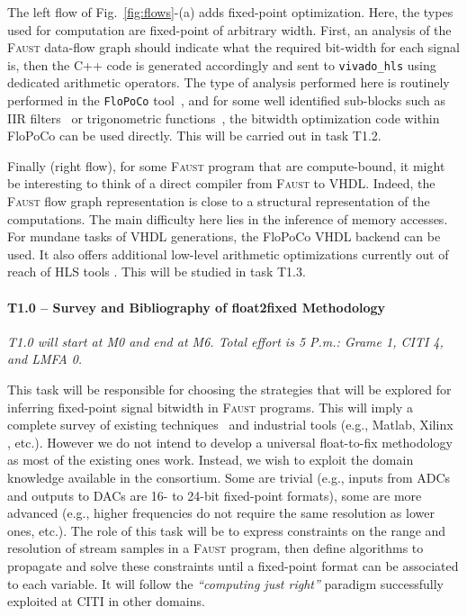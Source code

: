 \documentclass[a4paper,9pt]{extarticle}
\newcommand{\F}{\textsc{Faust}}
\begin{document}
The left flow of Fig.~\ref{fig:flows}-(a) adds fixed-point optimization.  Here, the types used for computation are fixed-point of arbitrary width. First, an analysis of the \F{} data-flow graph should indicate what the required bit-width for each signal is, then the C++ code is generated accordingly and sent to {\tt vivado\_hls} using dedicated arithmetic operators. The type of analysis performed here is routinely performed in the {\tt FloPoCo} tool~\cite{flopoco}, and for some well identified sub-blocks such as IIR filters~\cite{volkova:hal-01561052} or trigonometric functions~\cite{DinIstSer2013-HEART-SinCos,DinIsto2015}, the bitwidth optimization code within FloPoCo can be used directly. This will be carried out in task T1.2.

Finally (right flow), for some \F{} program that are compute-bound, it might be interesting to think of a direct compiler from \F{} to VHDL. Indeed, the \F{} flow graph representation is close to a structural representation of the computations. The main difficulty here lies in the inference of memory accesses. For mundane tasks of VHDL generations, the FloPoCo VHDL backend \cite{flopoco} can be used. It also offers additional low-level arithmetic optimizations currently out of reach of HLS tools \cite{DinIstSer2013-FPL-BitHeap}. This will be studied in task T1.3.

\paragraph{T1.0 -- Survey and Bibliography of float2fixed Methodology}

\textit{T1.0 will start at M0 and end at M6. Total effort is 5 P.m.: Grame 1, CITI 4, and LMFA 0.}

This task will be responsible for choosing the strategies that will be explored for inferring fixed-point signal bitwidth in \F{} programs. This will imply a complete survey of existing techniques~\cite{float2fixed2,cairn,sentieysid,volkova:hal-01561052} and industrial tools (e.g., Matlab, Xilinx \cite{XilinxFloat2Fixed}, etc.). However we do not intend to develop a universal float-to-fix methodology as most of the existing ones work. Instead, we wish to exploit the domain knowledge available in the consortium. Some are trivial (e.g., inputs from ADCs and outputs to DACs are 16- to 24-bit fixed-point formats), some are more advanced (e.g., higher frequencies do not require the same resolution as lower ones, etc.). The role of this task will be to express constraints on the range and resolution of stream samples in a \F{} program, then define algorithms to propagate and solve these constraints until a fixed-point format can be associated to each variable. It will follow the {\em ``computing just right''} paradigm successfully exploited at CITI in other domains.
\end{document}
